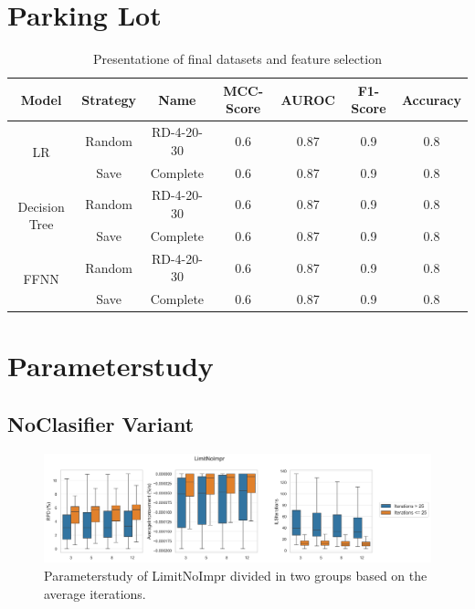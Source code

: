 \clearpage
\section{Parking Lot}
\begin{table}[ht]
    \centering
    \begin{tabular}{c c c c c c c}
        \toprule
        Model                          & Strategy & Name       & \gls{MCC}-Score & \gls{AUROC} & F1-Score & Accuracy \\
        \midrule
        \multirow{2}{*}{\gls{LR}}      & Random   & RD-4-20-30 & 0.6             & 0.87        & 0.9      & 0.8      \\
                                       & Save     & Complete   & 0.6             & 0.87        & 0.9      & 0.8      \\
        \midrule
        \multirow{2}{*}{Decision Tree} & Random   & RD-4-20-30 & 0.6             & 0.87        & 0.9      & 0.8      \\
                                       & Save     & Complete   & 0.6             & 0.87        & 0.9      & 0.8      \\
        \midrule
        \multirow{2}{*}{\gls{FFNN}}    & Random   & RD-4-20-30 & 0.6             & 0.87        & 0.9      & 0.8      \\
                                       & Save     & Complete   & 0.6             & 0.87        & 0.9      & 0.8      \\

        \bottomrule
    \end{tabular}
    \caption{Presentatione of final datasets and feature selection}
    \label{tab:final_dataset_features}
\end{table}
\clearpage


\section{Parameterstudy}

\subsection{NoClasifier Variant}
\label{app:subsec:parameterstudy_noclassifier}

\begin{figure}[!ht]
    \centering
    \includegraphics[width=\textwidth]{pictures/parameter_study/LimitNoImpr_base_parameter_study.png}
    \caption{Parameterstudy of LimitNoImpr divided in two groups based on the average iterations.}
    \label{fig:parameterstudy_NoClassifier_limitNoImpr}
\end{figure}

